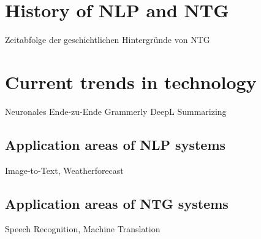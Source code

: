 \section{History of NLP and NTG}

Zeitabfolge der geschichtlichen Hintergründe von NTG 

\section{Current trends in technology}\label{ss:trends}

Neuronales Ende-zu-Ende
Grammerly
DeepL
Summarizing

\subsection{Application areas of NLP systems}
Image-to-Text, Weatherforecast

\subsection{Application areas of NTG systems}
Speech Recognition, Machine Translation